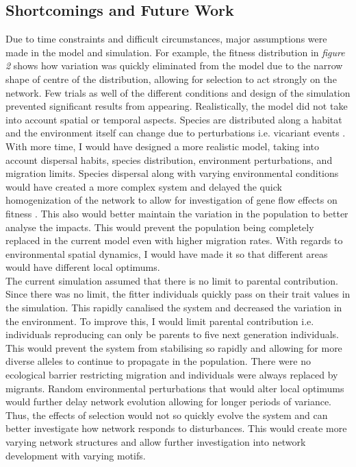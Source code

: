 \subsection{Shortcomings and Future Work}
Due to time constraints and difficult circumstances, major assumptions were made in the model and simulation. For example, the fitness distribution in \textit{figure 2} shows how variation was quickly eliminated from the model due to the narrow shape of centre of the distribution, allowing for selection to act strongly on the network. Few trials as well of the different conditions and design of the simulation prevented significant results from appearing. Realistically, the model did not take into account spatial or temporal aspects. Species are distributed along a habitat and the environment itself can change due to perturbations i.e. vicariant events \cite{garcia1997genetic}. With more time, I would have designed a more realistic model, taking into account dispersal habits, species distribution, environment perturbations, and migration limits. Species dispersal along with varying environmental conditions would have created a more complex system and delayed the quick homogenization of the network to allow for investigation of gene flow effects on fitness \cite{garcia1997genetic,barber1999patterns,sato2006effect}. This also would better maintain the variation in the population to better analyse the impacts. This would prevent the population being completely replaced in the current model even with higher migration rates. With regards to environmental spatial dynamics, I would have made it so that different areas would have different local optimums.\\
The current simulation assumed that there is no limit to parental contribution. Since there was no limit, the fitter individuals quickly pass on their trait values in the simulation. This rapidly canalised the system and decreased the variation in the environment. To improve this, I would limit parental contribution i.e. individuals reproducing can only be parents to five next generation individuals. This would prevent the system from stabilising so rapidly and allowing for more diverse alleles to continue to propagate in the population. There were no ecological barrier restricting migration and individuals were always replaced by migrants. Random environmental perturbations that would alter local optimums would further delay network evolution allowing for longer periods of variance. Thus, the effects of selection would not so quickly evolve the system and can better investigate how network responds to disturbances. This would create more varying network structures and allow further investigation into network development with varying motifs.\\
